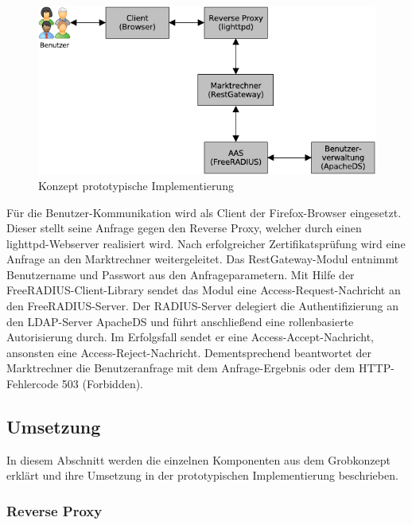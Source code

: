 \documentclass[11pt,a4paper]{report}
\begin{document}
\begin{figure}[htbp]
\centering
\includegraphics[scale=1]{images/design_architekture.pdf}
\caption{Konzept prototypische Implementierung}
\label{fig:konzept_proto_impl}
\end{figure}

Für die Benutzer-Kommunikation wird als Client der Firefox-Browser eingesetzt. Dieser stellt seine Anfrage gegen den Reverse Proxy, welcher durch einen lighttpd-Webserver realisiert wird. Nach erfolgreicher Zertifikatsprüfung wird eine Anfrage an den Marktrechner weitergeleitet. Das RestGateway-Modul entnimmt Benutzername und Passwort aus den Anfrageparametern. Mit Hilfe der FreeRADIUS-Client-Library sendet das Modul eine Access-Request-Nachricht an den FreeRADIUS-Server. Der RADIUS-Server delegiert die Authentifizierung an den LDAP-Server ApacheDS und führt anschließend eine rollenbasierte Autorisierung durch. Im Erfolgsfall sendet er eine Access-Accept-Nachricht, ansonsten eine Access-Reject-Nachricht. Dementsprechend beantwortet der Marktrechner die Benutzeranfrage mit dem Anfrage-Ergebnis oder dem HTTP-Fehlercode 503 (Forbidden).

\subsection{Umsetzung}

In diesem Abschnitt werden die einzelnen Komponenten aus dem Grobkonzept erklärt und ihre Umsetzung in der prototypischen Implementierung beschrieben.

\subsubsection{Reverse Proxy}
\end{document}
